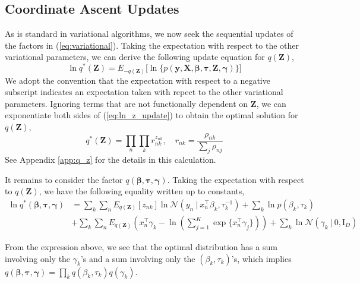 \documentclass[twoside,11pt]{article}
\newcommand{\eye}{\mathrm{I}}
\newcommand\given[1][]{\:#1\vert\:}
\newcommand{\transpose}[1]{#1^{\intercal}}
\newcommand{\kprod}{\prod_{k}}
\newcommand{\nsum}{\sum_{n}}
\newcommand{\ksum}{\sum_{k}}
\newcommand{\boldbeta}{\boldsymbol\beta}
\newcommand{\boldgamma}{\boldsymbol\gamma}
\newcommand{\boldtau}{\boldsymbol\tau}
\newcommand{\sumexp}{\sum_{j=1}^{K} \exp \{ \transpose{x_n} \gamma_j \}}
\newcommand{\pr}[1]{p \left( #1 \right)}
\begin{document}
\subsection{Coordinate Ascent Updates}

As is standard in variational algorithms, we now seek the sequential updates of the factors in (\ref{eq:variational}). Taking the expectation with respect to the other variational parameters, we can derive the following update equation for $q(\mathbf{Z})$,
\begin{equation} \label{eq:ln_z_update}
	\ln q^{*}(\mathbf{Z}) = E_{-q(\mathbf{Z})} \Big[ \ln \big\{ \pr{\mathbf{y}, \mathbf{X}, \boldbeta, \boldtau, \mathbf{Z}, \boldgamma} \big\} \Big]
\end{equation}
We adopt the convention that the expectation with respect to a negative subscript indicates an expectation taken with repect to the other variational parameters. Ignoring terms that are not functionally dependent on $\mathbf{Z}$, we can exponentiate both sides of (\ref{eq:ln_z_update}) to obtain the optimal solution for $q(\mathbf{Z})$,
\begin{equation} \label{optimal_z}
	 q^{*}(\mathbf{Z}) = \prod_{n} \prod_{k} r_{nk}^{z_{nk}}, \quad r_{nk} = \frac{\rho_{nk}}{\sum_{j} \rho_{nj}}
\end{equation}
See Appendix \ref{app:q_z} for the details in this calculation. %

It remains to consider the factor $q( \boldbeta, \boldtau, \boldgamma )$. Taking the expectation with respect to $q(\mathbf{Z})$, we have the following equality written up to constants,
\begin{equation} \label{eq:ln_beta_tau_gamma}
\begin{split}
	\ln q^{*}(\boldbeta, \boldtau, \boldgamma) &=  \ksum \nsum  E_{q(\mathbf{Z})}[z_{nk}] \ln \mathcal{N} \left( y_n \given \transpose{x_n} \beta_k, \tau_{k}^{-1} \right) + \ksum \ln \pr{\beta_k, \tau_k} \\
	& + \ksum \nsum E_{q(\mathbf{Z})} \left( \transpose{x_n} \gamma_k - \ln \left( \sumexp\right)\right) + \ksum \ln \mathcal{N}(\gamma_k \given 0, \eye_D)
\end{split}
\end{equation}

From the expression above, we see that the optimal distribution has a sum involving only the $\gamma_k$'s and a sum involving only the $(\beta_k, \tau_k)$'s, which implies $q(\boldbeta, \boldtau, \boldgamma) = \kprod q(\beta_k, \tau_k) q(\gamma_k)$.
\end{document}
